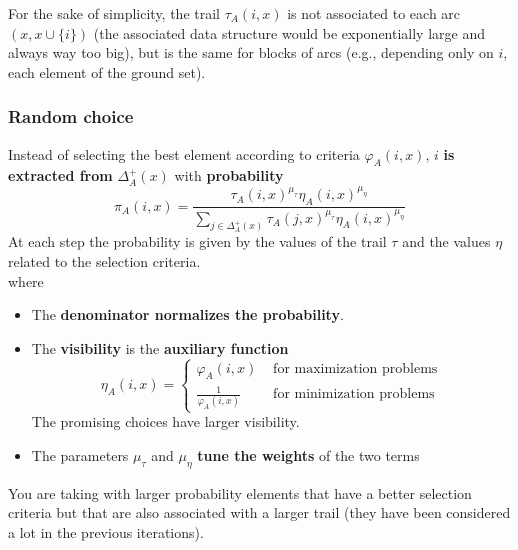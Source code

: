 For the sake of simplicity, the trail $\tau_A (i, x)$ is not associated to each arc $(x, x \cup \{i\})$ (the associated data structure would be exponentially large and always way too big), but is the same for blocks of arcs (e.g., depending only on $i$, each element of the ground set).\\

\newpage

\subsubsection{Random choice}
Instead of selecting the best element according to criteria $\varphi_A (i, x)$, $i$ \textbf{is extracted from} $\Delta_A^+ (x)$ with \textbf{probability}
$$ \pi_A (i,x) = \frac{ \tau_A (i, x)^{\mu_{\tau}} \eta_A (i, x)^{\mu_{\eta} } }{ \sum_{j \in \Delta_A^+ (x)} \tau_A (j, x)^{\mu_{\tau} } \eta_A (i,x)^{\mu_{\eta} } } $$
At each step the probability is given by the values of the trail $\tau$ and the values $\eta$ related to the selection criteria.\\

where
\begin{itemize}
	\item The \textbf{denominator normalizes the probability}.\\
	
	\item The \textbf{visibility} is the \textbf{auxiliary function}
	$$ \eta_A (i,x ) =  
	\begin{cases}
		\varphi_A (i, x) & \text{ for maximization problems} \\
		\frac{1}{\varphi_A (i, x)} & \text{ for minimization problems}
	\end{cases}
	$$
	The promising choices have larger visibility.\\
	
	\item The parameters $\mu_{\tau}$ and $\mu_{\eta}$ \textbf{tune the weights} of the two terms
\end{itemize}

You are taking with larger probability elements that have a better selection criteria but that are also associated with a larger trail (they have been considered a lot in the previous iterations).\\

\newpage

